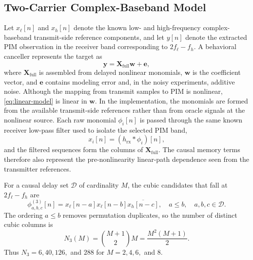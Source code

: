 \documentclass[conference]{IEEEtran}
\newcommand{\mat}[1]{\mathbf{#1}}
\begin{document}
\subsection{Two-Carrier Complex-Baseband Model}
Let $x_{\ell}[n]$ and $x_h[n]$ denote the known low- and high-frequency complex-baseband transmit-side reference components, and let $y[n]$ denote the extracted PIM observation in the receiver band corresponding to $2f_{\ell}-f_h$. A behavioral canceller represents the target as
\begin{equation}
  \mat y=\mat X_{\mathrm{full}}\mat w+\mat e,
  \label{eq:linear-model}
\end{equation}
where $\mat X_{\mathrm{full}}$ is assembled from delayed nonlinear monomials, $\mat w$ is the coefficient vector, and $\mat e$ contains modeling error and, in the noisy experiments, additive noise. Although the mapping from transmit samples to PIM is nonlinear, \eqref{eq:linear-model} is linear in $\mat w$. %
In the implementation, the monomials are formed from the available transmit-side references rather than from oracle signals at the nonlinear source.
Each raw monomial $\phi_i[n]$ is passed through the same known receiver low-pass filter used to isolate the selected PIM band,
\begin{equation}
 x_i[n]=(h_{\mathrm{rx}}*\phi_i)[n],
 \label{eq:filtered-column}
\end{equation}
and the filtered sequences form the columns of $\mat X_{\mathrm{full}}$. The causal memory terms therefore also represent the pre-nonlinearity linear-path dependence seen from the transmitter references.

For a causal delay set $\mathcal D$ of cardinality $M$, the cubic candidates that fall at $2f_{\ell}-f_h$ are
\begin{equation}
 \phi^{(3)}_{a,b,c}[n]
 =x_{\ell}[n-a]x_{\ell}[n-b]\overline{x_h[n-c]},
 \quad a\leq b,\quad a,b,c\in\mathcal D.
 \label{eq:cubic}
\end{equation}
The ordering $a\leq b$ removes permutation duplicates, so the number of distinct cubic columns is
\begin{equation}
 N_3(M)=\binom{M+1}{2}M=\frac{M^2(M+1)}{2}.
 \label{eq:n3}
\end{equation}
Thus $N_3=6,40,126,$ and $288$ for $M=2,4,6,$ and $8$.
\end{document}
